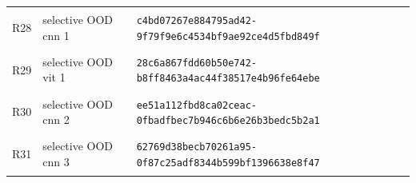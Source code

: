 \begin{longtable}{@{}l>{\raggedright\arraybackslash}p{3.5cm}p{10.8cm}@{}}
\hypertarget{R28}{R28} & selective OOD cnn 1 & {\fontsize{8.8}{11}\selectfont\texttt{c4bd07267e884795ad42-9f79f9e6c4534bf9ae92ce4d5fbd849f}} \\
\hypertarget{R29}{R29} & selective OOD vit 1 & {\fontsize{8.8}{11}\selectfont\texttt{28c6a867fdd60b50e742-b8ff8463a4ac44f38517e4b96fe64ebe}} \\
\hypertarget{R30}{R30} & selective OOD cnn 2 & {\fontsize{8.8}{11}\selectfont\texttt{ee51a112fbd8ca02ceac-0fbadfbec7b946c6b6e26b3bedc5b2a1}} \\
\hypertarget{R31}{R31} & selective OOD cnn 3 & {\fontsize{8.8}{11}\selectfont\texttt{62769d38becb70261a95-0f87c25adf8344b599bf1396638e8f47}} \\
\bottomrule\end{longtable}\endgroup
